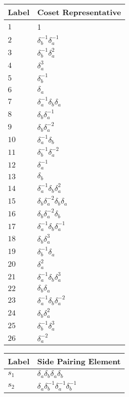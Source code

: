 \documentclass{article}
\begin{document}

\begin{center}
\begin{tabular}{ll}
\toprule
Label & Coset Representative\\
\midrule
$1$ & 1 \\
$2$ & $\delta_b^{-1}\delta_a^{-1}$ \\
$3$ & $\delta_b^{-1}\delta_a^{2}$ \\
$4$ & $\delta_a^{3}$ \\
$5$ & $\delta_b^{-1}$ \\
$6$ & $\delta_a^{}$ \\
$7$ & $\delta_a^{-1}\delta_b^{}\delta_a^{}$ \\
$8$ & $\delta_b^{}\delta_a^{-1}$ \\
$9$ & $\delta_b^{}\delta_a^{-2}$ \\
$10$ & $\delta_a^{-1}\delta_b^{}$ \\
$11$ & $\delta_b^{-1}\delta_a^{-2}$ \\
$12$ & $\delta_a^{-1}$ \\
$13$ & $\delta_b^{}$ \\
$14$ & $\delta_a^{-1}\delta_b^{}\delta_a^{2}$ \\
$15$ & $\delta_b^{}\delta_a^{-2}\delta_b^{}\delta_a^{}$ \\
$16$ & $\delta_b^{}\delta_a^{-2}\delta_b^{}$ \\
$17$ & $\delta_a^{-1}\delta_b^{}\delta_a^{-1}$ \\
$18$ & $\delta_b^{}\delta_a^{3}$ \\
$19$ & $\delta_b^{-1}\delta_a^{}$ \\
$20$ & $\delta_a^{2}$ \\
$21$ & $\delta_a^{-1}\delta_b^{}\delta_a^{3}$ \\
$22$ & $\delta_b^{}\delta_a^{}$ \\
$23$ & $\delta_a^{-1}\delta_b^{}\delta_a^{-2}$ \\
$24$ & $\delta_b^{}\delta_a^{2}$ \\
$25$ & $\delta_b^{-1}\delta_a^{3}$ \\
$26$ & $\delta_a^{-2}$ \\
\bottomrule
\end{tabular}
\hfill
\begin{tabular}{ll}
\toprule
Label & Side Pairing Element\\
\midrule
$s_{1}$ & $\delta_a^{}\delta_b^{}\delta_a^{}\delta_b^{}$ \\
$s_{2}$ & $\delta_a^{}\delta_b^{-1}\delta_a^{-1}\delta_b^{-1}$ \\

\end{tabular}
\end{center}
\end{document}
